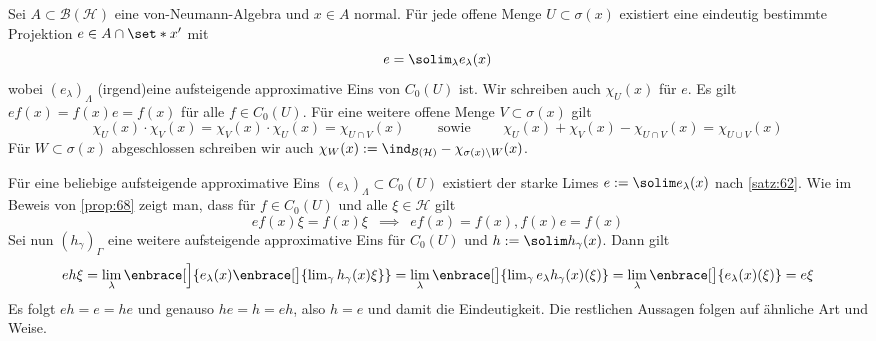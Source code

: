 \begin{proposition}[label=prop:612,{name=[approximative Einsen in offener Teilmenge des Spektrums]}]
	Sei $A \subset \mathcal{B}(\mathcal{H})$ eine von-Neumann-Algebra und $x \in A$ normal.
	Für jede offene Menge $U \subset \sigma(x)$ existiert eine eindeutig bestimmte Projektion $e \in A \cap \set*{x}'$ mit 
	\[
		e=\solim_\lambda e_\lambda(x)
	\]
	wobei $(e_\lambda)_\Lambda$ (irgend)eine aufsteigende approximative Eins von $C_0(U)$ ist.
	Wir schreiben auch $\chi_U(x)$ für $e$.
	Es gilt $e f(x) = f(x) e = f(x)$ für alle $f \in C_0(U)$.
	Für eine weitere offene Menge $V \subset \sigma(x)$ gilt 
	\[
		\chi_U(x) \cdot \chi_V(x)=\chi_V(x) \cdot \chi_U(x) = \chi_{U \cap V}(x) \qquad\! \text{ sowie } \qquad\!\chi_U(x) + \chi_V(x) - \chi_{U \cap V}(x)= \chi_{U \cup V}(x) 
	\]
	Für $W \subset \sigma(x)$ abgeschlossen schreiben wir auch $\chi_W(x) := \ind_{\mathcal{B}(\mathcal{H})}-\chi_{\sigma(x)\setminus W}(x)$.
\end{proposition}
\begin{beweis}
	Für eine beliebige aufsteigende approximative Eins $(e_\lambda)_\Lambda \subset C_0(U)$ existiert der starke Limes $e := \solim e_\lambda(x)$ nach \autoref{satz:62}.
	Wie im Beweis von \autoref{prop:68} zeigt man, dass für $f \in C_0(U)$ und alle $\xi \in \mathcal{H}$ gilt
	\[
		e f(x) \xi = f(x) \xi \enspace\implies\enspace e f(x) = f(x), f(x) e = f(x)
	\]
	Sei nun $(h_\gamma)_{\Gamma}$ eine weitere aufsteigende approximative Eins für $C_0(U)$ und $h := \solim h_\gamma(x)$.
	Dann gilt
	\[
		e h \xi = \lim_\lambda \enbrace[\Big]{e_\lambda(x) \enbrace[\big]{\lim\nolimits_\gamma h_\gamma(x) \xi}} = \lim_{\lambda} \enbrace[\big]{\lim\nolimits_\gamma e_\lambda h_\gamma(x)(\xi)}
		= \lim_\lambda \enbrace[\big]{e_\lambda(x)(\xi)} = e \xi
	\]
	Es folgt $ e h = e = h e$ und genauso $h e = h =eh$, also $h=e$ und damit die Eindeutigkeit. 
	Die restlichen Aussagen folgen auf ähnliche Art und Weise.
\end{beweis}

